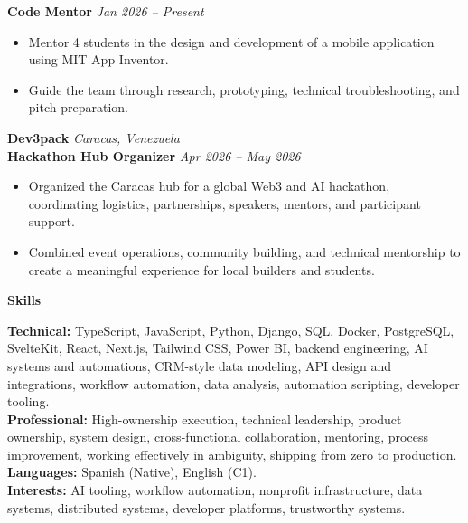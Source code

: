 \documentclass[11pt]{article}
\begin{document}
\textbf{Code Mentor} \hfill \textit{Jan 2026 -- Present}
\begin{itemize}
    \item Mentor 4 students in the design and development of a mobile application using MIT App Inventor.
    \item Guide the team through research, prototyping, technical troubleshooting, and pitch preparation.
\end{itemize}
\vspace{10pt}
\textbf{Dev3pack} \hfill \textit{Caracas, Venezuela} \\
\textbf{Hackathon Hub Organizer} \hfill \textit{Apr 2026 -- May 2026}
\begin{itemize}
    \item Organized the Caracas hub for a global Web3 and AI hackathon, coordinating logistics, partnerships, speakers, mentors, and participant support.
    \item Combined event operations, community building, and technical mentorship to create a meaningful experience for local builders and students.
\end{itemize}
\vspace{8pt}
\begin{center}
    \textbf{Skills}
\end{center}
\vspace{-4pt}
\textbf{Technical:} TypeScript, JavaScript, Python, Django, SQL, Docker, PostgreSQL, SvelteKit, React, Next.js, Tailwind CSS, Power BI, backend engineering, AI systems and automations, CRM-style data modeling, API design and integrations, workflow automation, data analysis, automation scripting, developer tooling.
\\[4pt]
\textbf{Professional:} High-ownership execution, technical leadership, product ownership, system design, cross-functional collaboration, mentoring, process improvement, working effectively in ambiguity, shipping from zero to production. \\[4pt]
\textbf{Languages:} Spanish (Native), English (C1). \\[4pt]
\textbf{Interests:} AI tooling, workflow automation, nonprofit infrastructure, data systems, distributed systems, developer platforms, trustworthy systems.
\end{document}
